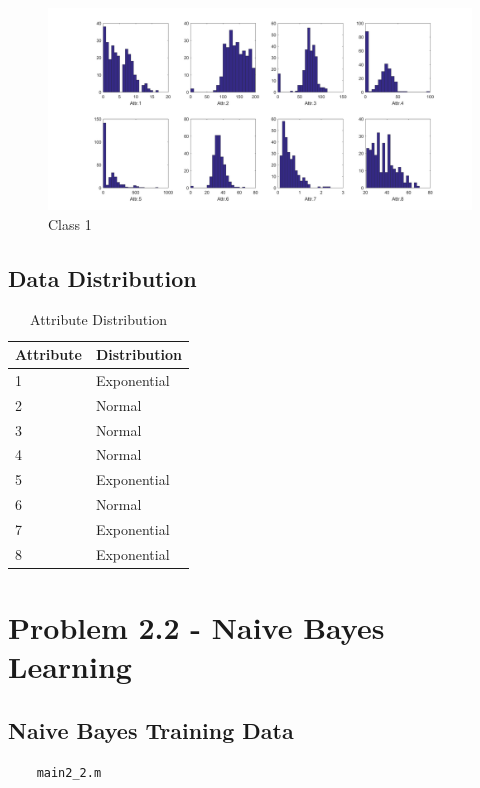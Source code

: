 \documentclass[12pt, letterpaper]{report}
\begin{document}
\begin{figure}[H]
	\centering
	\includegraphics[width=\columnwidth]{p2a1.png}
	\caption{Class 1}
\end{figure}

\subsection{Data Distribution}

\begin{table}[H]
	\centering
	\begin{tabular}{ |l|l| }
		\hline
		\textbf{Attribute} & \textbf{Distribution} \\
		\hline
		1 & Exponential \\
		\hline
		2 & Normal \\
		\hline
		3 & Normal \\
		\hline
		4 & Normal \\
		\hline
		5 & Exponential\\
		\hline
		6 & Normal \\
		\hline
		7 & Exponential \\
		\hline
		8 & Exponential \\
		\hline
	\end{tabular}
	\caption{Attribute Distribution}
\end{table}

\section{Problem 2.2 - Naive Bayes Learning}

\subsection{Naive Bayes Training Data}

\begin{verbatim}
    main2_2.m
\end{verbatim}
\end{document}
